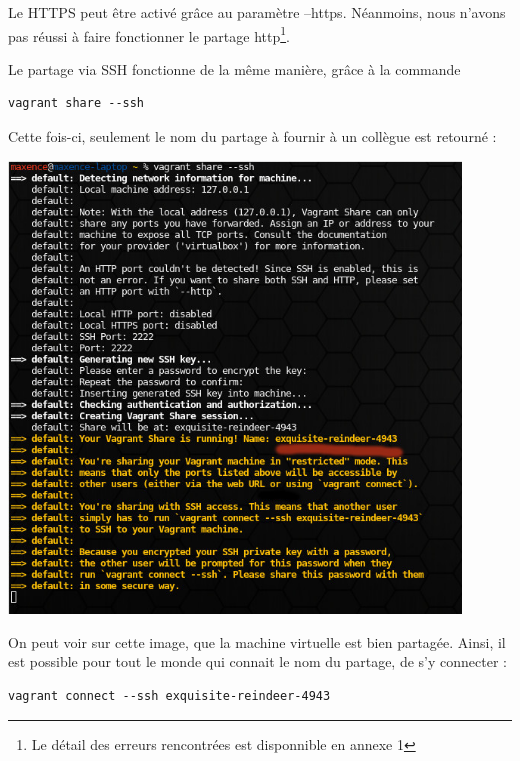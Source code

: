 \documentclass[12pt,a4paper]{article}
\begin{document}
Le HTTPS peut être activé grâce au paramètre --https. Néanmoins, nous n'avons pas réussi à faire fonctionner le partage http\footnote{Le détail des erreurs rencontrées est disponnible en annexe 1}.

\newpage{}
Le partage via SSH fonctionne de la même manière, grâce à la commande
\begin{lstlisting}
vagrant share --ssh
\end{lstlisting}
Cette fois-ci, seulement le nom du partage à fournir à un collègue est retourné :

\begin{center}
	\includegraphics[width=12cm]{images_rapport/vagrantshare.jpg}
\end{center}

On peut voir sur cette image, que la machine virtuelle est bien partagée. Ainsi, il est possible pour tout le monde qui connait le nom du partage, de s'y connecter : 

\begin{lstlisting}
vagrant connect --ssh exquisite-reindeer-4943
\end{lstlisting}
\end{document}
